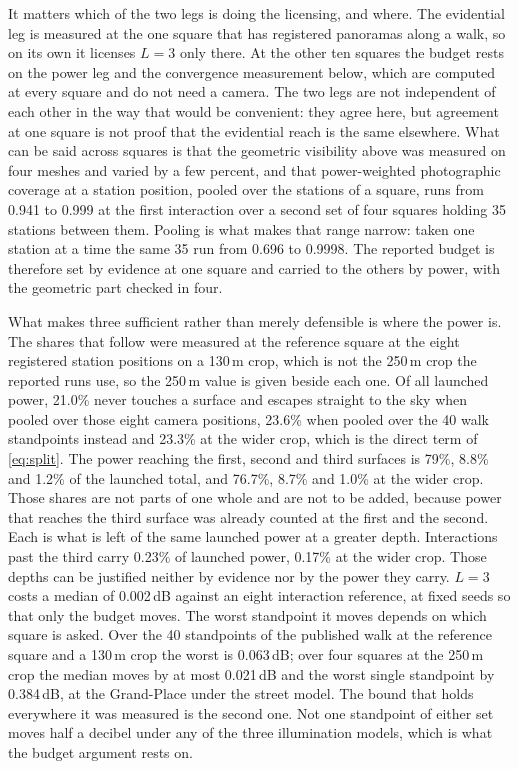 It matters which of the two legs is doing the licensing, and where. The
evidential leg is measured at the one square that has registered panoramas along
a walk, so on its own it licenses $L = 3$ only there. At the other ten squares
the budget rests on the power leg and the convergence measurement below, which
are computed at every square and do not need a camera. The two legs are not
independent of each other in the way that would be convenient: they agree here,
but agreement at one square is not proof that the evidential reach is the same
elsewhere. What can be said across squares is that the geometric visibility
above was measured on four meshes and varied by a few
percent, and that power-weighted photographic coverage at a station position,
pooled over the stations of a square, runs from 0.941 to 0.999 at the first
interaction over a second set of four squares holding 35 stations between them.
Pooling is what makes that range narrow: taken one station at a time the same
35 run from 0.696 to 0.9998. The reported budget is therefore set by evidence at
one square and carried to the others by power, with the geometric part checked
in four.

What makes three sufficient rather than merely defensible is where the power is.
The shares that follow were measured at the reference square at the eight
registered station positions on a 130\,m crop, which is not the 250\,m crop the
reported runs use, so the 250\,m value is given beside each one. Of all launched
power, 21.0\% never touches a surface and escapes straight
to the sky when pooled over those eight camera positions, 23.6\% when pooled
over the 40 walk standpoints instead and 23.3\% at the wider crop, which is the
direct term of \eqref{eq:split}. The power reaching the first, second and third surfaces is
79\%, 8.8\% and 1.2\% of the launched total, and 76.7\%, 8.7\% and 1.0\% at the
wider crop. Those shares are not parts of one whole and are not to be added,
because power that reaches the third surface was already counted at the first
and the second. Each is what is left of the same launched power at a greater
depth. Interactions past the third carry 0.23\% of launched power, 0.17\% at the
wider crop. Those depths can be justified
neither by evidence nor by the power they carry. $L = 3$ costs a median of
0.002\,dB against an eight interaction reference, at fixed seeds so that only
the budget moves. The worst standpoint it moves depends on which square is
asked. Over the 40 standpoints of the published walk at the reference square and
a 130\,m crop the worst is 0.063\,dB; over four squares at the 250\,m crop the
median moves by at most 0.021\,dB and the worst single standpoint by
0.384\,dB, at the Grand-Place under the street model. The bound that holds
everywhere it was measured is the second one. Not one standpoint of either set
moves half a decibel under any of the three illumination models, which is what
the budget argument rests on.

